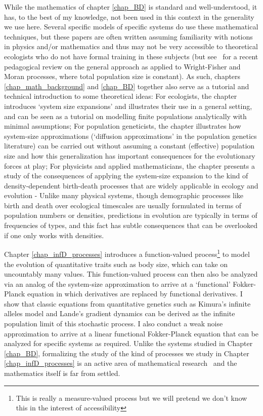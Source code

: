 While the mathematics of chapter \ref{chap_BD} is standard and well-understood, it has, to the best of my knowledge, not been used in this context in the generality we use here. Several specific models of specific systems do use these mathematical techniques, but these papers are often written assuming familiarity with notions in physics and/or mathematics and thus may not be very accessible to theoretical ecologists who do not have formal training in these subjects (but see~\cite{czuppon_understanding_2021} for a recent pedagogical review on the general approach as applied to Wright-Fisher and Moran processes, where total population size is constant). As such, chapters \ref{chap_math_background} and \ref{chap_BD} together also serve as a tutorial and technical introduction to some theoretical ideas: For ecologists, the chapter introduces `system size expansions' and illustrates their use in a general setting, and can be seen as a tutorial on modelling finite populations analytically with minimal assumptions; For population geneticists, the chapter illustrates how system-size approximations (`diffusion approximations' in the population genetics literature) can be carried out without assuming a constant (effective) population size and how this generalization has important consequences for the evolutionary forces at play; For physicists and applied mathematicians, the chapter presents a study of the consequences of applying the system-size expansion to the kind of density-dependent birth-death processes that are widely applicable in ecology and evolution - Unlike many physical systems, though demographic processes like birth and death over ecological timescales are usually formulated in terms of population numbers or densities, predictions in evolution are typically in terms of frequencies of types, and this fact has subtle consequences that can be overlooked if one only works with densities.

Chapter \ref{chap_infD_processes} introduces a function-valued process\footnote{This is really a measure-valued process but we will pretend we don't know this in the interest of accessibility} to model the evolution of quantitative traits such as body size, which can take on uncountably many values. This function-valued process can then also be analyzed via an analog of the system-size approximation to arrive at a `functional' Fokker-Planck equation in which derivatives are replaced by functional derivatives. I show that classic equations from quantitative genetics such as Kimura's infinite alleles model and Lande's gradient dynamics can be derived as the infinite population limit of this stochastic process. I also conduct a weak noise approximation to arrive at a linear functional Fokker-Planck equation that can be analyzed for specific systems as required. Unlike the systems studied in Chapter \ref{chap_BD}, formalizing the study of the kind of processes we study in Chapter \ref{chap_infD_processes} is an active area of mathematical research~\citep{carmona_stochastic_1999,da_prato_stochastic_2014,prevot_concise_2007,liu_stochastic_2015,bogachev_fokker-planck-kolmogorov_2015,balan_gentle_2018} and the mathematics itself is far from settled.

